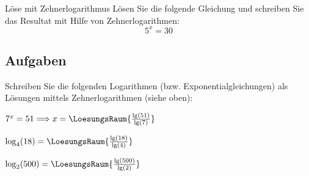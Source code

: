 


\begin{beispiel}{Löse mit Zehnerlogarithmus}{}
  Lösen Sie die folgende Gleichung und schreiben Sie das Resultat mit
  Hilfe von Zehnerlogarithmen:
  $$5^x = 30$$
\end{beispiel}


\subsection*{Aufgaben}

Schreiben Sie die folgenden Logarithmen (bzw. Exponentialgleichungen)
als Lösungen mittels Zehnerlogarithmen (siehe oben):


 $7^x = 51 \Longrightarrow x= \LoesungsRaum{\frac{\lg(51)}{\lg(7)}}$


$\log_4(18) = \LoesungsRaum{\frac{\lg(18)}{\lg(4)}}$

$\log_2(500) = \LoesungsRaum{\frac{\lg(500)}{\lg(2)}}$





%

